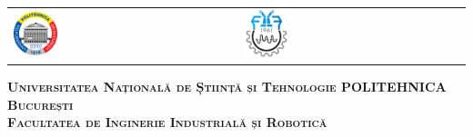



\begin{titlepage}
	\centering
	\begin{tabular}{p{6cm}p{3.2cm}}
		\includegraphics[width=0.2\textwidth]{img/upb.png} &
		\includegraphics[width=0.22\textwidth]{img/fiir.png}
	\end{tabular}
	\vspace{1cm}

	{\scshape\Large \textbf{Universitatea Națională de Știință și Tehnologie POLITEHNICA București} \\}
	{\scshape\Large \textbf{Facultatea de Inginerie Industrială și Robotică} \\}
	
\end{titlepage}

